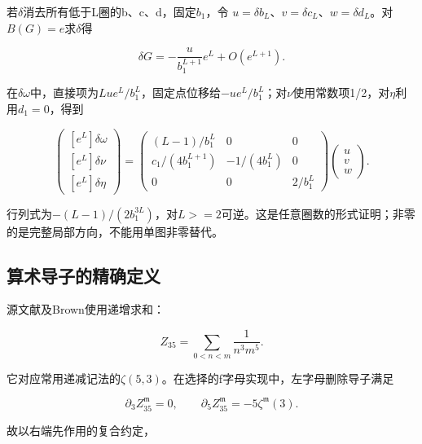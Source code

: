 \documentclass[11pt,a4paper,oneside]{ctexrep}
\theoremstyle{cnplain}
\theoremstyle{definition}
\theoremstyle{remark}
\begin{document}
若\(\delta\)消去所有低于L圈的b、c、d，固定\(b_1\)，令 \(u=\delta  b_L\)、\(v=\delta  c_L\)、\(w=\delta  d_L\)。对\(B(G)=e\)求\(\delta\)得

\begin{equation}
\delta G=-\frac{u}{b_1^{L+1}}e^L+O(e^{L+1}).
\end{equation}

在\(\delta  \omega\)中，直接项为\(L u e^L/b_1^L\)，固定点位移给\(-u e^L/b_1^L\)；对\(\nu\)使用常数项1/2，对\(\eta\)利用\(d_1=0\)，得到

\begin{equation}
\begin{pmatrix}[e^L]\delta\omega\\{}[e^L]\delta\nu\\{}[e^L]\delta\eta\end{pmatrix}
 =
 \begin{pmatrix}
 (L-1)/b_1^L&0&0\\
 c_1/(4b_1^{L+1})&-1/(4b_1^L)&0\\
 0&0&2/b_1^L
 \end{pmatrix}
 \begin{pmatrix}u\\v\\w\end{pmatrix}.               \label{eq:rg:20}
\end{equation}

行列式为\(-(L-1)/(2b_1^{3L})\)，对\(L>=2\)可逆。这是任意圈数的形式证明；非零的是完整局部方向，不能用单图非零替代。

\subsection{算术导子的精确定义}\label{sec:rg:7.1}

源文献\cite[eq.(17)]{kp}及Brown\cite[eq.(2.6)]{brownmzv}使用递增求和：

\begin{equation}
Z_{35}=\sum_{0<n<m}\frac1{n^3m^5}.
\end{equation}

它对应常用递减记法的\(\zeta (5,3)\)。在\cite[§6.1]{brownmzv}选择的f字母实现中，左字母删除导子满足

\begin{equation}
\partial_3 Z_{35}^{\mathfrak m}=0,\qquad
 \partial_5 Z_{35}^{\mathfrak m}=-5\zeta^{\mathfrak m}(3).
\end{equation}

故以右端先作用的复合约定，
\end{document}
